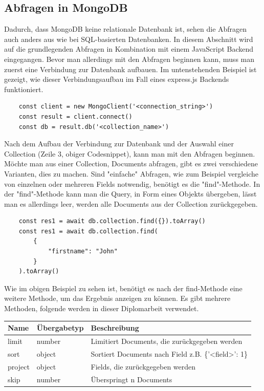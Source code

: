 \subsection{Abfragen in MongoDB}
Dadurch, dass MongoDB keine relationale Datenbank ist, sehen die Abfragen auch anders aus wie bei SQL-basierten Datenbanken. In diesem Abschnitt wird auf die grundlegenden Abfragen in Kombination mit einem JavaScript Backend eingegangen. Bevor man allerdings mit den Abfragen beginnen kann, muss man zuerst eine Verbindung zur Datenbank aufbauen. Im untenstehenden Beispiel ist gezeigt, wie dieser Verbindungsaufbau im Fall eines express.js Backends funktioniert.
\begin{lstlisting}
    const client = new MongoClient('<connection_string>')
    const result = client.connect()
    const db = result.db('<collection_name>')
\end{lstlisting}
Nach dem Aufbau der Verbindung zur Datenbank und der Auswahl einer Collection (Zeile 3, obiger Codesnippet), kann man mit den Abfragen beginnen.
\newline
Möchte man aus einer Collection, Documents abfragen, gibt es zwei verschiedene Varianten, dies zu machen. Sind "einfache" Abfragen, wie zum Beispiel vergleiche von einzelnen oder mehreren Fields notwendig, benötigt es die "find"-Methode. In der "find"-Methode kann man die Query, in Form eines Objekts übergeben, lässt man es allerdings leer, werden alle Documents aus der Collection zurückgegeben.
\begin{lstlisting}
    const res1 = await db.collection.find({}).toArray()
    const res1 = await db.collection.find(
        {
            "firstname": "John"
        }
    ).toArray()
\end{lstlisting}
Wie im obigen Beispiel zu sehen ist, benötigt es nach der find-Methode eine weitere Methode, um das Ergebnis anzeigen zu können. Es gibt mehrere Methoden, folgende werden in dieser Diplomarbeit verwendet.
\begin{center}
    \begin{tabular}{ | m{3cm} | m{2.3cm}| m{8cm} | } 
        \hline
        Name & Übergabetyp & Beschreibung \\ [0.5ex] 
        \hline\hline
        limit & number & Limitiert Documents, die zurückgegeben werden \\
        \hline
        sort & object & Sortiert Documents nach Field z.B. \{'<field>': 1\} \\
        \hline
        project & object & Fields, die zurückgegeben werden \\
        \hline
        skip & number & Überspringt n Documents \\
        \hline
    \end{tabular}
\end{center}
